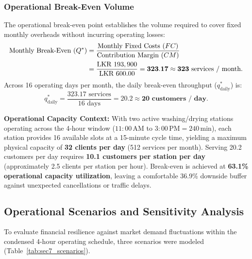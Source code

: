 \subsubsection{Operational Break-Even Volume}
The operational break-even point establishes the volume required to cover fixed monthly overheads without incurring operating losses:
\begin{align}
    \text{Monthly Break-Even } (Q^*) &= \frac{\text{Monthly Fixed Costs } (FC)}{\text{Contribution Margin } (CM)} \notag \\
    &= \frac{\text{LKR } 193,900}{\text{LKR } 600.00} = \mathbf{323.17 \approx 323\text{ services / month}}.
\end{align}
Across 16 operating days per month, the daily break-even throughput ($q^*_{\text{daily}}$) is:
\begin{equation}
    q^*_{\text{daily}} = \frac{323.17\text{ services}}{16\text{ days}} = \mathbf{20.2 \approx 20\text{ customers / day}}.
\end{equation}

\textbf{Operational Capacity Context:}
With two active washing/drying stations operating across the 4-hour window ($11{:}00\,\text{AM}$ to $3{:}00\,\text{PM} = 240\,\text{min}$), each station provides 16 available slots at a 15-minute cycle time, yielding a maximum physical capacity of \textbf{32 clients per day} (512 services per month). Serving 20.2 customers per day requires \textbf{10.1 customers per station per day} (approximately 2.5 clients per station per hour). Break-even is achieved at \textbf{63.1\% operational capacity utilization}, leaving a comfortable 36.9\% downside buffer against unexpected cancellations or traffic delays.

\subsection{Operational Scenarios and Sensitivity Analysis}
\label{subsec:operational_scenarios}

To evaluate financial resilience against market demand fluctuations within the condensed 4-hour operating schedule, three scenarios were modeled (Table~\ref{tab:sec7_scenarios}).

